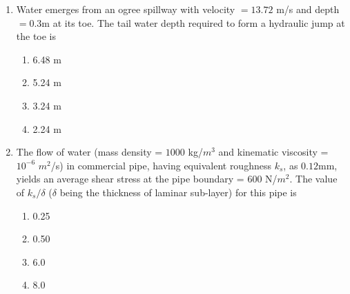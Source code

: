 \documentclass[journal]{IEEEtran}
\begin{document}
\begin{enumerate}
	\item Water emerges from an ogree spillway with velocity $= 13.72$ m/s and depth $= 0.3$m at its toe. The tail water depth required to form a hydraulic jump at the toe is
\begin{multicols}{2}
	\begin{enumerate}
		\item 6.48 m
		\item 5.24 m
		\item 3.24 m
		\item 2.24 m
	\end{enumerate}
\end{multicols}
	\item The flow of water (mass density = $1000$ kg/$m^3$ and kinematic viscosity = $10^{-6}$ $m^2$/s) in commercial pipe, having equivalent roughness $k_s$, as $0.12$mm, yields an average shear stress at the pipe boundary = $600$ N/$m^2$. The value of $k_s / \delta$ ($\delta$ being the thickness of laminar sub-layer) for this pipe is
		\begin{multicols}{2}
	\begin{enumerate}
		\item 0.25
		\item 0.50
		\item 6.0
		\item 8.0
	\end{enumerate}
\end{multicols}


\end{enumerate}
\end{document}
